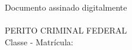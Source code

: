 \begin{center}
	Documento assinado digitalmente\\
	\textbf{\pfauthor}\\
	PERITO CRIMINAL FEDERAL\\
	Classe \pfauthorclass - Matrícula: \pfauthormatr
\end{center}
